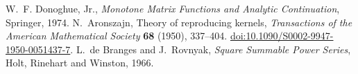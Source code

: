  W.~F. Donoghue, Jr., \emph{Monotone Matrix Functions and Analytic Continuation}, Springer, 1974.
 N.~Aronszajn, Theory of reproducing kernels, \emph{Transactions of the American Mathematical Society} \textbf{68} (1950), 337--404. \href{https://doi.org/10.1090/S0002-9947-1950-0051437-7}{doi:10.1090/S0002-9947-1950-0051437-7}.
 L.~de Branges and J.~Rovnyak, \emph{Square Summable Power Series}, Holt, Rinehart and Winston, 1966.
